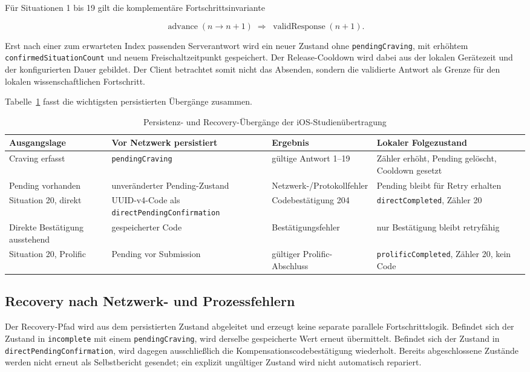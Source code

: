 \begin{neu}
Für Situationen 1 bis 19 gilt die komplementäre Fortschrittsinvariante

\[
\operatorname{advance}(n\rightarrow n+1)
\;\Rightarrow\;
\operatorname{validResponse}(n+1).
\]

Erst nach einer zum erwarteten Index passenden Serverantwort wird ein neuer Zustand ohne \texttt{pendingCraving}, mit erhöhtem \texttt{confirmedSituationCount} und neuem Freischaltzeitpunkt gespeichert. Der Release-Cooldown wird dabei aus der lokalen Gerätezeit und der konfigurierten Dauer gebildet. Der Client betrachtet somit nicht das Absenden, sondern die validierte Antwort als Grenze für den lokalen wissenschaftlichen Fortschritt.

Tabelle~\ref{tab:ios-recovery-transitions} fasst die wichtigsten persistierten Übergänge zusammen.

\begin{table}[htbp]
\centering
\caption{Persistenz- und Recovery-Übergänge der iOS-Studienübertragung}
\label{tab:ios-recovery-transitions}
\begin{tabular}{p{}p{}p{}p{}}
\textbf{Ausgangslage} & \textbf{Vor Netzwerk persistiert} & \textbf{Ergebnis} & \textbf{Lokaler Folgezustand} \\
\hline
Craving erfasst & \texttt{pendingCraving} & gültige Antwort 1--19 & Zähler erhöht, Pending gelöscht, Cooldown gesetzt \\
Pending vorhanden & unveränderter Pending-Zustand & Netzwerk-/Protokollfehler & Pending bleibt für Retry erhalten \\
Situation 20, direkt & UUID-v4-Code als \texttt{directPendingConfirmation} & Codebestätigung 204 & \texttt{directCompleted}, Zähler 20 \\
Direkte Bestätigung ausstehend & gespeicherter Code & Bestätigungsfehler & nur Bestätigung bleibt retryfähig \\
Situation 20, Prolific & Pending vor Submission & gültiger Prolific-Abschluss & \texttt{prolificCompleted}, Zähler 20, kein Code \\
\end{tabular}
\end{table}

\subsection{Recovery nach Netzwerk- und Prozessfehlern}

Der Recovery-Pfad wird aus dem persistierten Zustand abgeleitet und erzeugt keine separate parallele Fortschrittslogik. Befindet sich der Zustand in \texttt{incomplete} mit einem \texttt{pendingCraving}, wird derselbe gespeicherte Wert erneut übermittelt. Befindet sich der Zustand in \texttt{directPendingConfirmation}, wird dagegen ausschließlich die Kompensationscodebestätigung wiederholt. Bereits abgeschlossene Zustände werden nicht erneut als Selbstbericht gesendet; ein explizit ungültiger Zustand wird nicht automatisch repariert.


\end{neu}
